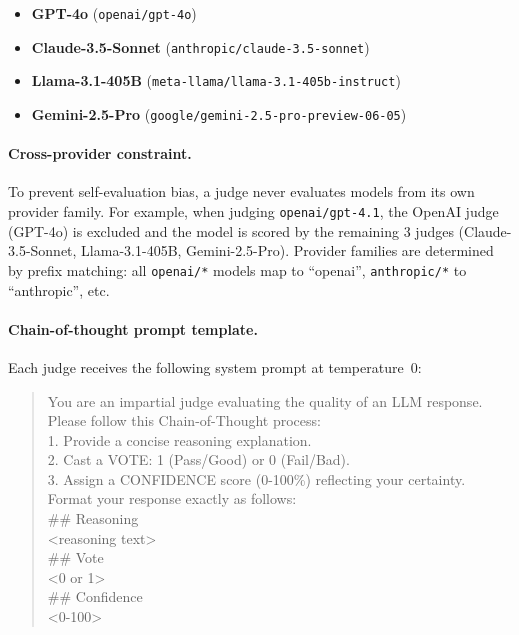 \begin{itemize}[leftmargin=*,noitemsep]
    \item \textbf{GPT-4o} (\texttt{openai/gpt-4o})
    \item \textbf{Claude-3.5-Sonnet} (\texttt{anthropic/claude-3.5-sonnet})
    \item \textbf{Llama-3.1-405B} (\texttt{meta-llama/llama-3.1-405b-instruct})
    \item \textbf{Gemini-2.5-Pro} (\texttt{google/gemini-2.5-pro-preview-06-05})
\end{itemize}

\paragraph{Cross-provider constraint.}
To prevent self-evaluation bias, a judge never evaluates models from its own provider family.
For example, when judging \texttt{openai/gpt-4.1}, the OpenAI judge (GPT-4o) is excluded and the model is scored by the remaining 3 judges (Claude-3.5-Sonnet, Llama-3.1-405B, Gemini-2.5-Pro).
Provider families are determined by prefix matching: all \texttt{openai/*} models map to ``openai'', \texttt{anthropic/*} to ``anthropic'', etc.

\paragraph{Chain-of-thought prompt template.}
Each judge receives the following system prompt at temperature~0:

\begin{quote}
\small\ttfamily
You are an impartial judge evaluating the quality of an LLM response.\\
Please follow this Chain-of-Thought process:\\
1. Provide a concise reasoning explanation.\\
2. Cast a VOTE: 1 (Pass/Good) or 0 (Fail/Bad).\\
3. Assign a CONFIDENCE score (0-100\%) reflecting your certainty.\\[0.5em]
Format your response exactly as follows:\\[0.5em]
\#\# Reasoning\\
<reasoning text>\\[0.3em]
\#\# Vote\\
<0 or 1>\\[0.3em]
\#\# Confidence\\
<0-100>
\end{quote}

